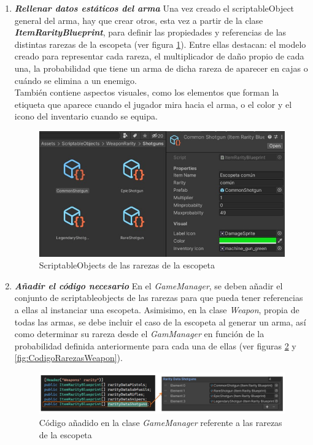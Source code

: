 \begin{enumerate}
    \item \textbf{\textit{Rellenar datos estáticos del arma}}
    Una vez creado el scriptableObject general del arma, hay que crear otros, esta vez a partir de la clase \textbf{\textit{ItemRarityBlueprint}}, para definir las propiedades y referencias de las distintas rarezas de la escopeta (ver figura \ref{fig:ScriptableObjectRarezas}). Entre ellas destacan: el modelo creado para representar cada rareza, el multiplicador de daño propio de cada una, la probabilidad que tiene un arma de dicha rareza de aparecer en cajas o cuándo se elimina a un enemigo.\\
    También contiene aspectos visuales, como los elementos que forman la etiqueta que aparece cuando el jugador mira hacia el arma, o el color y el icono del inventario cuando se equipa.
    
    \begin{figure}[h]
    \centering
    \includegraphics[scale=0.45]{img/CommonShotgunRarity.jpg}
    \caption{ScriptableObjects de las rarezas de la escopeta}
    \label{fig:ScriptableObjectRarezas}
    \end{figure}
    
    \item \textbf{\textit{Añadir el código necesario}}
     En el \textit{GameManager}, se deben añadir el conjunto de scriptableobjects de las rarezas para que pueda tener referencias a ellas al instanciar una escopeta. Asimisimo, en la clase \textit{Weapon}, propia de todas las armas, se debe incluir el caso de la escopeta al generar un arma, así como determinar su rareza desde el \textit{GamManager} en función de la probabilidad definida anteriormente para cada una de ellas (ver figuras \ref{fig:CodigoRarezasGameManager} y \ref{fig:CodigoRarezasWeapon}).
     
     \begin{figure}[h]
    \centering
    \includegraphics[scale=0.45]{img/ShotgunRarity.jpg}
    \caption{Código añadido en la clase \textit{GameManager} referente a las rarezas de la escopeta}
    \label{fig:CodigoRarezasGameManager}
    \end{figure}
    

\end{enumerate}
